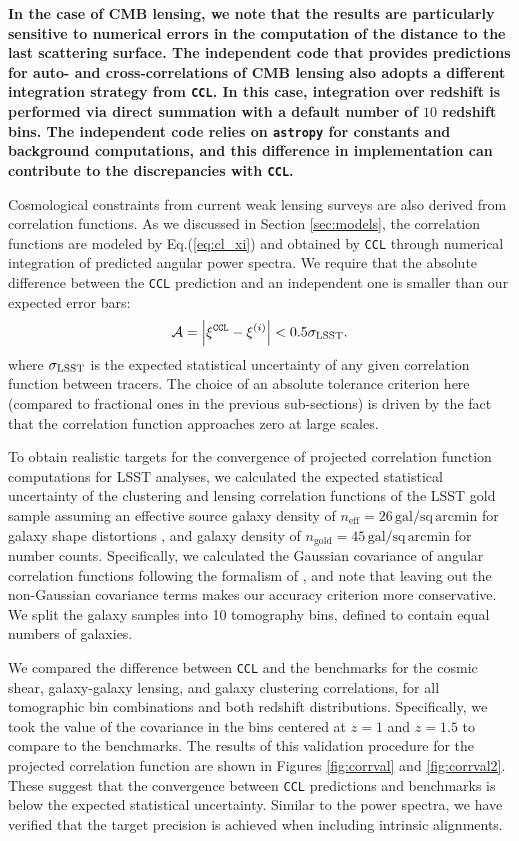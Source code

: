 \documentclass[\docopts]{\docclass}
\newcommand{\ccl}{{\tt CCL}\xspace}
\begin{document}
{\bf In the case of CMB lensing, we note that the results are particularly sensitive to numerical errors in the computation of the distance to the last scattering surface. The independent code that provides predictions for auto- and cross-correlations of CMB lensing also adopts a different integration strategy from \ccl. In this case, integration over redshift is performed via direct summation with a default number of $10$ redshift bins. The independent code relies on {\tt astropy} for constants and background computations, and this difference in implementation can contribute to the discrepancies with \ccl.}

Cosmological constraints from current weak lensing surveys are also derived from correlation functions. As we discussed in Section \ref{sec:models}, the correlation functions are modeled by Eq.(\ref{eq:cl_xi}) and obtained by \ccl through numerical integration of predicted angular power spectra. We require that the absolute difference between the \ccl prediction and an independent one is smaller than our expected error bars:
\begin{equation}
  \mathcal{A}=\left|\xi^{\tt CCL}-\xi^{(i)}\right|<0.5\sigma_{\rm LSST}.
\end{equation}
where $\sigma_{\rm LSST}$ is the expected statistical uncertainty of any given correlation function between tracers. The choice of an absolute tolerance criterion here (compared to fractional ones in the previous sub-sections) is driven by the fact that the correlation function approaches zero at large scales.

To obtain realistic targets for the convergence of projected correlation function computations for LSST analyses, we calculated the expected statistical uncertainty of the clustering and lensing correlation functions of the LSST gold sample \citep{LSSTSB} assuming an effective source galaxy density of $n_\mathrm{eff} = 26\,\mathrm{gal/sq\,arcmin}$ for galaxy shape distortions \citep{Chang13}, and galaxy density of $n_\mathrm{gold} = 45\,\mathrm{gal/sq\,arcmin}$ for number counts. Specifically, we calculated the Gaussian covariance of angular correlation functions following the formalism of \citet{2008A&A...477...43J}, and note that leaving out the non-Gaussian covariance terms makes our accuracy criterion more conservative. We split the galaxy samples into 10 tomography bins, defined to contain equal numbers of galaxies.

We compared the difference between \ccl and the benchmarks for the cosmic shear, galaxy-galaxy lensing, and galaxy clustering correlations, for all tomographic bin combinations and both redshift distributions. Specifically, we took the value of the covariance in the bins centered at $z=1$ and $z=1.5$ to compare to the benchmarks. The results of this validation procedure for the projected correlation function are shown in Figures \ref{fig:corrval} and \ref{fig:corrval2}. These suggest that the convergence between \ccl predictions and benchmarks is below the expected statistical uncertainty. Similar to the power spectra, we have verified that the target precision is achieved when including intrinsic alignments.
\end{document}
